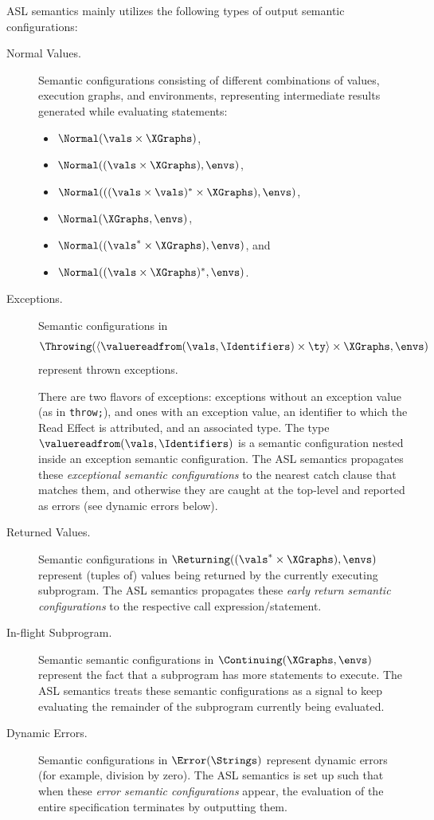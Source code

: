 ASL semantics mainly utilizes the following types of output semantic configurations:
\begin{description}
  \item[Normal Values.] \hypertarget{def-normal}{}
  Semantic configurations consisting of different combinations of values,
  execution graphs, and environments, representing intermediate results
  generated while evaluating statements:
  \begin{itemize}
  \item $\Normal(\vals \times \XGraphs)$,
  \item $\Normal((\vals \times \XGraphs), \envs)$,
  \item $\Normal(((\vals \times \vals)^* \times \XGraphs), \envs)$,
  \item $\Normal(\XGraphs, \envs)$,
  \item $\Normal((\vals^* \times \XGraphs), \envs)$, and
  \item $\Normal((\vals\times\XGraphs)^*, \envs)$.
  \end{itemize}

  \hypertarget{def-throwing}{}
  \item[Exceptions.] Semantic configurations in
  \[
    \Throwing(\langle \valuereadfrom(\vals,\Identifiers) \times \ty\rangle \times \XGraphs, \envs)
  \]
  represent thrown exceptions.
  \hypertarget{def-valuereadfrom}{}

  There are two flavors of exceptions:
  exceptions without an exception value (as in \texttt{throw;}), and ones with an exception value,
  an identifier to which the Read Effect is attributed, and an associated type.
  The type $\valuereadfrom(\vals,\Identifiers)$ is a semantic configuration nested inside an exception semantic configuration.
  The ASL semantics propagates these \emph{exceptional semantic configurations} to the nearest catch clause that matches
  them, and otherwise they are caught at the top-level and reported as errors (see dynamic errors below).

  \hypertarget{def-returning}{}
  \item[Returned Values.] Semantic configurations in $\Returning((\vals^* \times \XGraphs), \envs)$
  represent (tuples of) values being returned by the currently executing subprogram.
  The ASL semantics propagates these \emph{early return semantic configurations} to the respective call expression/statement.

  \hypertarget{def-continuing}{}
  \item[In-flight Subprogram.] Semantic semantic configurations in $\Continuing(\XGraphs, \envs)$
  represent the fact that a subprogram has more statements to execute.
  The ASL semantics treats these semantic configurations as a signal to keep evaluating the remainder
  of the subprogram currently being evaluated.

  \hypertarget{def-error}{}
  \item[Dynamic Errors.] Semantic configurations in $\Error(\Strings)$
  represent dynamic errors (for example, division by zero).
  The ASL semantics is set up such that when these \emph{error semantic configurations} appear,
  the evaluation of the entire specification terminates by outputting them.
\end{description}

